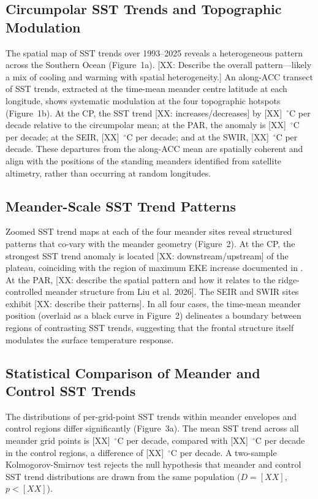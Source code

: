 \documentclass[draft]{agujournal2019}
\begin{document}
\subsection{Circumpolar SST Trends and Topographic Modulation}

The spatial map of SST trends over 1993--2025 reveals a heterogeneous pattern across the Southern Ocean (Figure~1a).
[XX: Describe the overall pattern---likely a mix of cooling and warming with spatial heterogeneity.]
An along-ACC transect of SST trends, extracted at the time-mean meander centre latitude at each longitude, shows systematic modulation at the four topographic hotspots (Figure~1b).
At the CP, the SST trend [XX: increases/decreases] by [XX]~$^{\circ}$C per decade relative to the circumpolar mean; at the PAR, the anomaly is [XX]~$^{\circ}$C per decade; at the SEIR, [XX]~$^{\circ}$C per decade; and at the SWIR, [XX]~$^{\circ}$C per decade.
These departures from the along-ACC mean are spatially coherent and align with the positions of the standing meanders identified from satellite altimetry, rather than occurring at random longitudes.


\subsection{Meander-Scale SST Trend Patterns}

Zoomed SST trend maps at each of the four meander sites reveal structured patterns that co-vary with the meander geometry (Figure~2).
At the CP, the strongest SST trend anomaly is located [XX: downstream/upstream] of the plateau, coinciding with the region of maximum EKE increase documented in .
At the PAR, [XX: describe the spatial pattern and how it relates to the ridge-controlled meander structure from Liu et al. 2026].
The SEIR and SWIR sites exhibit [XX: describe their patterns].
In all four cases, the time-mean meander position (overlaid as a black curve in Figure~2) delineates a boundary between regions of contrasting SST trends, suggesting that the frontal structure itself modulates the surface temperature response.


\subsection{Statistical Comparison of Meander and Control SST Trends}

The distributions of per-grid-point SST trends within meander envelopes and control regions differ significantly (Figure~3a).
The mean SST trend across all meander grid points is [XX]~$^{\circ}$C per decade, compared with [XX]~$^{\circ}$C per decade in the control regions, a difference of [XX]~$^{\circ}$C per decade.
A two-sample Kolmogorov-Smirnov test rejects the null hypothesis that meander and control SST trend distributions are drawn from the same population ($D = [XX]$, $p < [XX]$).
\end{document}
